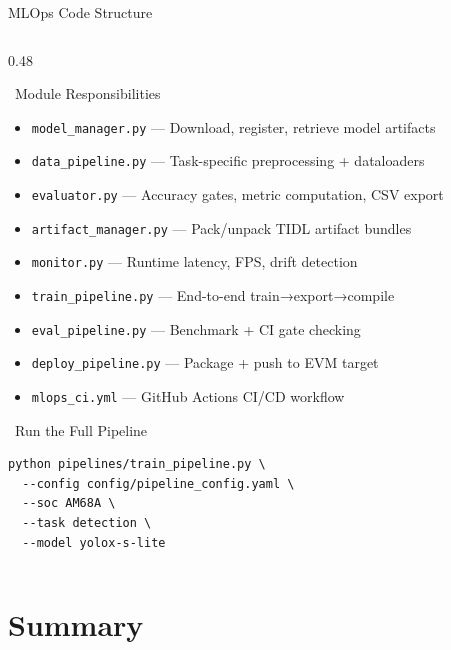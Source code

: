 \documentclass[aspectratio=169,12pt]{beamer}
\begin{document}
\begin{frame}{MLOps Code Structure}
\begin{columns}[T]
    \begin{column}{0.48\textwidth}
      \begin{block}{\faInfoCircle~Module Responsibilities}
        \begin{itemize}\scriptsize
          \item \texttt{model\_manager.py} — Download, register, retrieve model artifacts
          \item \texttt{data\_pipeline.py} — Task-specific preprocessing + dataloaders
          \item \texttt{evaluator.py} — Accuracy gates, metric computation, CSV export
          \item \texttt{artifact\_manager.py} — Pack/unpack TIDL artifact bundles
          \item \texttt{monitor.py} — Runtime latency, FPS, drift detection
          \item \texttt{train\_pipeline.py} — End-to-end train→export→compile
          \item \texttt{eval\_pipeline.py} — Benchmark + CI gate checking
          \item \texttt{deploy\_pipeline.py} — Package + push to EVM target
          \item \texttt{mlops\_ci.yml} — GitHub Actions CI/CD workflow
        \end{itemize}
      \end{block}

      \vspace{0.3cm}
      \begin{alertblock}{\faTerminal~Run the Full Pipeline}
        \begin{lstlisting}
python pipelines/train_pipeline.py \
  --config config/pipeline_config.yaml \
  --soc AM68A \
  --task detection \
  --model yolox-s-lite
        \end{lstlisting}
      \end{alertblock}
    \end{column}
  \end{columns}
\end{frame}

\section{Summary}
\end{document}

